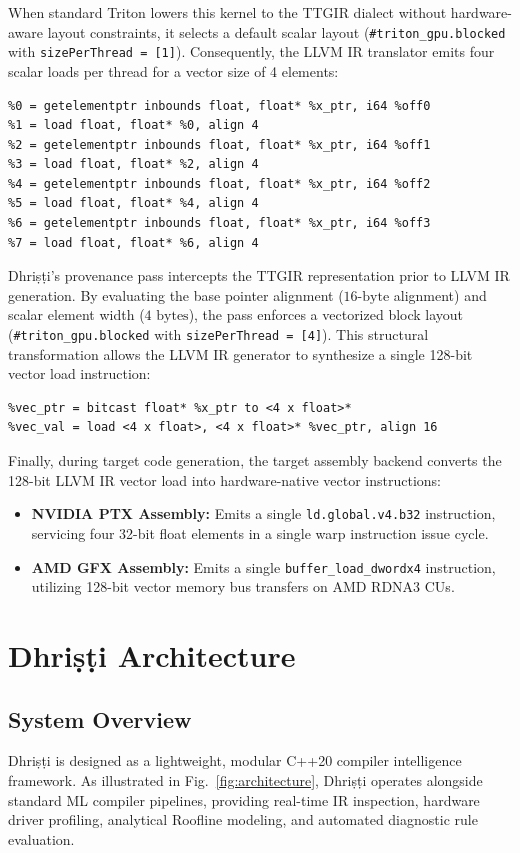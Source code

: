\documentclass[10pt,journal,compsoc]{IEEEtran}
\begin{document}
When standard Triton lowers this kernel to the TTGIR dialect without hardware-aware layout constraints, it selects a default scalar layout (\texttt{\#triton\_gpu.blocked} with \texttt{sizePerThread = [1]}). Consequently, the LLVM IR translator emits four scalar loads per thread for a vector size of 4 elements:
\begin{lstlisting}
%0 = getelementptr inbounds float, float* %x_ptr, i64 %off0
%1 = load float, float* %0, align 4
%2 = getelementptr inbounds float, float* %x_ptr, i64 %off1
%3 = load float, float* %2, align 4
%4 = getelementptr inbounds float, float* %x_ptr, i64 %off2
%5 = load float, float* %4, align 4
%6 = getelementptr inbounds float, float* %x_ptr, i64 %off3
%7 = load float, float* %6, align 4
\end{lstlisting}

Dhri\d{s}\d{t}i's provenance pass intercepts the TTGIR representation prior to LLVM IR generation. By evaluating the base pointer alignment ($16\text{-byte}$ alignment) and scalar element width ($4\text{ bytes}$), the pass enforces a vectorized block layout (\texttt{\#triton\_gpu.blocked} with \texttt{sizePerThread = [4]}). This structural transformation allows the LLVM IR generator to synthesize a single 128-bit vector load instruction:
\begin{lstlisting}
%vec_ptr = bitcast float* %x_ptr to <4 x float>*
%vec_val = load <4 x float>, <4 x float>* %vec_ptr, align 16
\end{lstlisting}

Finally, during target code generation, the target assembly backend converts the 128-bit LLVM IR vector load into hardware-native vector instructions:
\begin{itemize}
    \item \textbf{NVIDIA PTX Assembly:} Emits a single \texttt{ld.global.v4.b32} instruction, servicing four 32-bit float elements in a single warp instruction issue cycle.
    \item \textbf{AMD GFX Assembly:} Emits a single \texttt{buffer\_load\_dwordx4} instruction, utilizing 128-bit vector memory bus transfers on AMD RDNA3 CUs.
\end{itemize}

\section{Dhri\d{s}\d{t}i Architecture}\label{sec:architecture}

\subsection{System Overview}
Dhri\d{s}\d{t}i is designed as a lightweight, modular C++20 compiler intelligence framework. As illustrated in Fig.~\ref{fig:architecture}, Dhri\d{s}\d{t}i operates alongside standard ML compiler pipelines, providing real-time IR inspection, hardware driver profiling, analytical Roofline modeling, and automated diagnostic rule evaluation.
\end{document}
